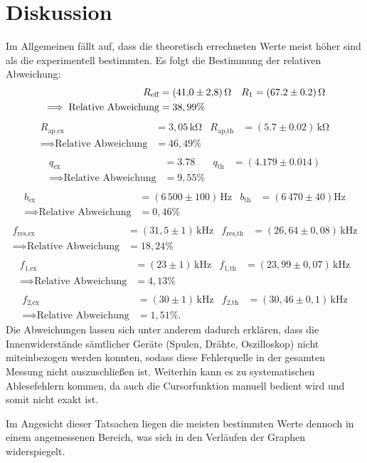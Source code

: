 \section{Diskussion}
\label{sec:Diskussion}

Im Allgemeinen fällt auf, dass die theoretisch errechneten 
Werte meist höher sind als die experimentell bestimmten. Es folgt die Bestimmung der relativen Abweichung:
\begin{align*}
R_\text{eff} &= (\num{41.0 +- 2.8})\,\si{\ohm} & R_1 &= (67.2 \pm 0.2 )\,\si{\ohm} \\
\implies \text{Relative Abweichung} &= 38,99\% \\
\end{align*}
\begin{align*}
R_\text{ap,ex} &= 3,05\,\si{\kilo\ohm} & R_\text{ap,th} &= (5.7 \pm 0.02)\,\si{\kilo\ohm}\\
\implies \text{Relative Abweichung} &= 46,49\% \\
\end{align*}
\begin{align*}
q_\text{ex} &= \num{3.78} & q_\text{th} &= (4.179 \pm 0.014)\\
\implies \text{Relative Abweichung} &= 9,55\% \\
\end{align*}
\begin{align*}
b_\text{ex} &= (6\,500 \pm 100)\,\si{\hertz} & b_\text{th} &= (6\,470 \pm 40)\si{\hertz} \\
\implies \text{Relative Abweichung} &= 0,46\% \\
\end{align*}
\begin{align*}
f_\text{res,ex} &= (31,5 \pm 1)\, \si{\kilo\hertz} & f_\text{res,th} &= (26,64 \pm 0,08)\,\si{\kilo\hertz}\\
\implies \text{Relative Abweichung} &= 18,24\% \\
\end{align*}
\begin{align*}
f_\text{1,ex} &= (23 \pm 1)\,\si{\kilo\hertz} & f_\text{1,th} &= (23,99 \pm 0,07)\,\si{\kilo\hertz}\\
\implies \text{Relative Abweichung} &= 4,13\% \\
\end{align*}
\begin{align*}
f_\text{2,ex} &= (30 \pm 1)\,\si{\kilo\hertz} & f_\text{2,th} &= (30,46 \pm 0,1)\,\si{\kilo\hertz} \\
\implies \text{Relative Abweichung} &= 1,51\%.
\end{align*}
Die Abweichungen lassen sich unter anderem dadurch erklären, dass die Innenwiderstände 
sämtlicher Geräte (Spulen, Drähte, Oszilloskop) nicht miteinbezogen werden konnten, 
sodass diese Fehlerquelle in der gesamten Messung nicht auszuschließen ist. Weiterhin kann
es zu systematischen Ablesefehlern kommen, da auch die Cursorfunktion manuell bedient wird
und somit nicht exakt ist.

\noindent Im Angesicht dieser Tatsachen liegen die meisten bestimmten Werte dennoch in einem angemessenen Bereich, was sich in den 
Verläufen der Graphen widerspiegelt.